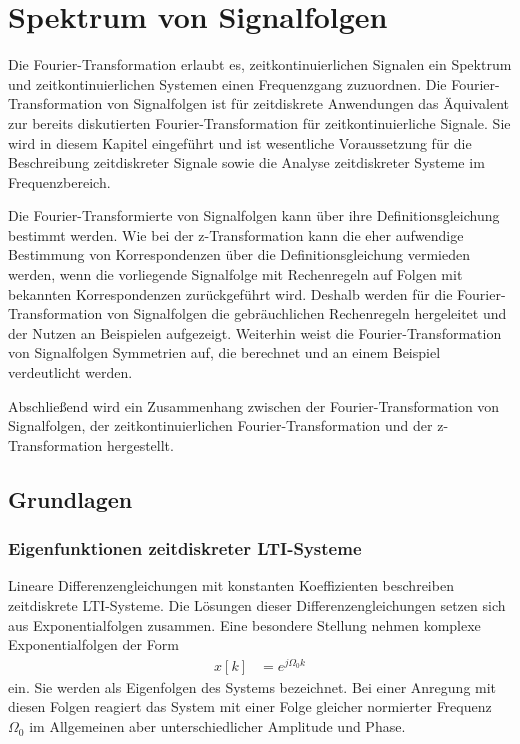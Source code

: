 \chapter{Spektrum von Signalfolgen}\label{sec:spektrum-von-signalfolgen}

Die Fourier-Transformation erlaubt es, zeitkontinuierlichen Signalen ein Spektrum und zeitkontinuierlichen Systemen einen Frequenzgang zuzuordnen. Die Fourier-Transformation von Signalfolgen ist für zeitdiskrete Anwendungen das Äquivalent zur bereits diskutierten Fourier-Transformation für zeitkontinuierliche Signale. Sie wird in diesem Kapitel eingeführt und ist wesentliche Voraussetzung für die Beschreibung zeitdiskreter Signale sowie die Analyse zeitdiskreter Systeme im Frequenzbereich.

Die Fourier-Transformierte von Signalfolgen kann über ihre Definitionsgleichung bestimmt werden. Wie bei der z-Transformation kann die eher aufwendige Bestimmung von Korrespondenzen über die Definitionsgleichung vermieden werden, wenn die vorliegende Signalfolge mit Rechenregeln auf Folgen mit bekannten Korrespondenzen zurückgeführt wird. Deshalb werden für die Fourier-Transformation von Signalfolgen die gebräuchlichen Rechenregeln hergeleitet und der Nutzen an Beispielen aufgezeigt. Weiterhin weist die Fourier-Transformation von Signalfolgen Symmetrien auf, die berechnet und an einem Beispiel verdeutlicht werden.

Abschließend wird ein Zusammenhang zwischen der Fourier-Transformation von Signalfolgen, der zeitkontinuierlichen Fourier-Transformation und der z-Transformation hergestellt.

\section{Grundlagen}\label{sec:7.1}

\subsection{Eigenfunktionen zeitdiskreter LTI-Systeme}\label{sec:eigenfunktionen-zeitdiskreter-lti-systeme}

Lineare Differenzengleichungen mit konstanten Koeffizienten beschreiben zeitdiskrete LTI-Systeme. Die Lösungen dieser Differenzengleichungen setzen sich aus Exponentialfolgen zusammen. Eine besondere Stellung nehmen komplexe Exponentialfolgen der Form
\begin{align}
x[ k] &= e^{j  \Omega_{0}  k} \label{eq:7.1}
\end{align}
ein. Sie werden als Eigenfolgen des Systems bezeichnet. Bei einer Anregung mit diesen Folgen reagiert das System mit einer Folge gleicher normierter Frequenz \(Ω_{0}\) im Allgemeinen aber unterschiedlicher Amplitude und Phase.

